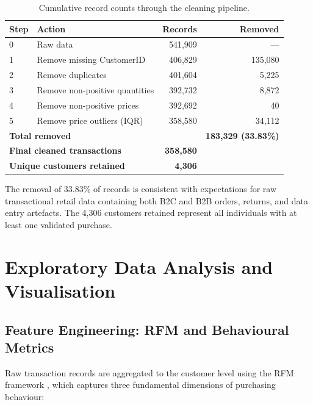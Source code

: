 \documentclass[12pt,a4paper]{article}
\begin{document}
\begin{table}[H]
  \centering
  \caption{Cumulative record counts through the cleaning pipeline.}
  \label{tab:cleaning}
  \begin{tabular}{llrr}
    \toprule
    \textbf{Step} & \textbf{Action} & \textbf{Records} & \textbf{Removed} \\
    \midrule
    0 & Raw data                          & 541,909 & ---    \\
    1 & Remove missing CustomerID         & 406,829 & 135,080 \\
    2 & Remove duplicates                 & 401,604 & 5,225  \\
    3 & Remove non-positive quantities    & 392,732 & 8,872  \\
    4 & Remove non-positive prices        & 392,692 & 40     \\
    5 & Remove price outliers (IQR)       & 358,580 & 34,112 \\
    \midrule
    \multicolumn{2}{l}{\textbf{Total removed}} & & \textbf{183,329 (33.83\%)} \\
    \multicolumn{2}{l}{\textbf{Final cleaned transactions}} & \textbf{358,580} & \\
    \multicolumn{2}{l}{\textbf{Unique customers retained}} & \textbf{4,306} & \\
    \bottomrule
  \end{tabular}
\end{table}

The removal of 33.83\% of records is consistent with expectations for raw transactional
retail data containing both B2C and B2B orders, returns, and data entry artefacts.
The 4,306 customers retained represent all individuals with at least one validated purchase.

\section{Exploratory Data Analysis and Visualisation}

\subsection{Feature Engineering: RFM and Behavioural Metrics}

Raw transaction records are aggregated to the customer level using the RFM framework
\parencite{rfm_hughes1994}, which captures three fundamental dimensions of purchasing
behaviour:
\end{document}
